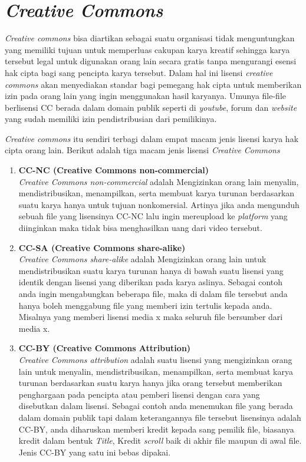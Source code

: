 \section{\textit{Creative Commons}}
\label{sec: Creative Commons}

\textit{Creative commons} bisa diartikan sebagai suatu organisasi tidak menguntungkan yang memiliki tujuan untuk memperluas cakupan karya kreatif sehingga karya tersebut legal untuk digunakan orang lain secara gratis tanpa mengurangi esensi hak cipta bagi sang pencipta karya tersebut. Dalam hal ini lisensi \textit{creative commons} akan menyediakan standar bagi pemegang hak cipta untuk memberikan izin pada orang lain yang ingin menggunakan hasil karyanya. Umunya file-file berlisensi CC berada dalam domain publik seperti di \textit{youtube}, forum dan \textit{website} yang sudah memiliki izin pendistribusian dari pemilikinya.

\textit{Creative commons} itu sendiri terbagi dalam empat macam jenis lisensi karya hak cipta orang lain. Berikut adalah tiga macam jenis lisensi \textit{Creative Commons} 

\begin{enumerate}
\item \textbf{CC-NC (Creative Commons non-commercial)} \\
\textit{Creative Commons non-commercial} adalah Mengizinkan orang lain menyalin, mendistribusikan, menampilkan, serta membuat karya turunan berdasarkan suatu karya hanya untuk tujuan nonkomersial. Artinya jika anda mengunduh sebuah file yang lisensinya CC-NC lalu ingin mereupload ke \textit{platform} yang diinginkan maka tidak bisa menghasilkan uang dari video tersebut. 

\item \textbf{ CC-SA (Creative Commons share-alike)} \\
\textit{Creative Commons share-alike} adalah Mengizinkan orang lain untuk mendistribusikan suatu karya turunan hanya di bawah suatu lisensi yang identik dengan lisensi yang diberikan pada karya aslinya. Sebagai contoh anda ingin mengabungkan beberapa file, maka di dalam file tersebut anda hanya boleh menggabung file yang memberi izin tertulis kepada anda. Misalnya yang memberi lisensi media x maka seluruh file bersumber dari media x.

\item \textbf{CC-BY (Creative Commons Attribution)}\\
\textit{Creative Commons attribution} adalah suatu lisensi yang mengizinkan orang lain untuk menyalin, mendistribusikan, menampilkan, serta membuat karya turunan berdasarkan suatu karya hanya jika orang tersebut memberikan penghargaan pada pencipta atau pemberi lisensi dengan cara yang disebutkan dalam lisensi. Sebagai contoh anda menemukan file yang berada dalam domain publik tapi dalam keterangannya file tersebut lisensinya adalah CC-BY, anda diharuskan memberi kredit kepada sang pemilik file, biasanya kredit dalam bentuk \textit{Title}, Kredit \textit{scroll} baik di akhir file maupun di awal file. Jenis CC-BY yang satu ini bebas dipakai.
\end{enumerate}



